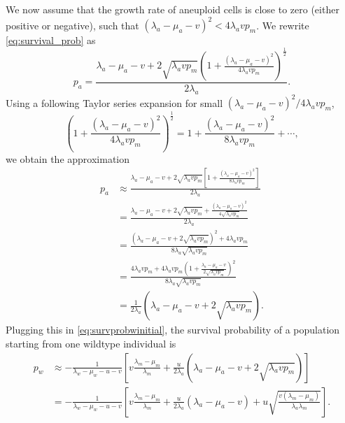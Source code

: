 \documentclass[12pt]{extarticle}
\begin{document}
\begin{appendices}
We now assume that the growth rate of aneuploid cells is close to zero (either positive or negative), such that  $\left(\lambda_a-\mu_a-v\right)^2 < 4\lambda_avp_m$.
We rewrite \cref{eq:survival_prob} as
\begin{equation}
p_a = \frac{\lambda_a-\mu_a-v+2\sqrt{\lambda_a vp_m}\left(1+\frac{\left(\lambda_a-\mu_a-v\right)^2}{4\lambda_avp_m}\right)^{\frac12}}{2\lambda_a} .
\end{equation}
Using a following Taylor series expansion for small $\left(\lambda_a-\mu_a-v\right)^2 / 4\lambda_avp_m$,
\begin{equation*}
\left(1+\frac{\left(\lambda_a-\mu_a-v\right)^2}{4\lambda_avp_m}\right)^{\frac{1}{2}}=1+\frac{\left(\lambda_a-\mu_a-v\right)^2}{8\lambda_avp_m}+\cdots,
\end{equation*}
we obtain the approximation
\begin{equation}
\begin{aligned}
p_a&\approx\frac{\lambda_a-\mu_a-v+2\sqrt{\lambda_a vp_m}\left[1+\frac{\left(\lambda_a-\mu_a-v\right)^2}{8\lambda_avp_m}\right]}{2\lambda_a}\\
&=\frac{\lambda_a-\mu_a-v+2\sqrt{\lambda_a vp_m}+\frac{\left(\lambda_a-\mu_a-v\right)^2}{4\sqrt{\lambda_avp_m}}}{2\lambda_a}\\
&=\frac{\left(\lambda_a-\mu_a-v+2\sqrt{\lambda_avp_m}\right)^2+4\lambda_avp_m}{8\lambda_a\sqrt{\lambda_avp_m}}\\
&=\frac{4\lambda_avp_m+4\lambda_avp_m\left(1+\frac{\lambda_a-\mu_a-v}{2\sqrt{\lambda_avp_m}}\right)^2}{8\lambda_a\sqrt{\lambda_avp_m}}\\
&=\frac{1}{2\lambda_a}\left(\lambda_a-\mu_a-v+2\sqrt{\lambda_avp_m}\right).
\end{aligned}
\end{equation}
Plugging this in \cref{eq:survprobwinitial}, the survival probability of a population starting from one wildtype individual is
\begin{equation}\label{eq:scenario3}
\begin{aligned}
p_w&\approx-\frac{1}{\lambda_w-\mu_w-u-v}\left[v\frac{\lambda_m-\mu_m}{\lambda_m}+\frac{u}{2\lambda_a}\left(\lambda_a-\mu_a-v+2\sqrt{\lambda_avp_m}\right)\right]\\
&=-\frac{1}{\lambda_w-\mu_w-u-v}\left[v\frac{\lambda_m-\mu_m}{\lambda_m}+\frac{u}{2\lambda_a}\left(\lambda_a-\mu_a-v\right)+u\sqrt{\frac{v\left(\lambda_m-\mu_m\right)}{\lambda_a\lambda_m}}\right].
\end{aligned}
\end{equation}


\end{appendices}
\end{document}
